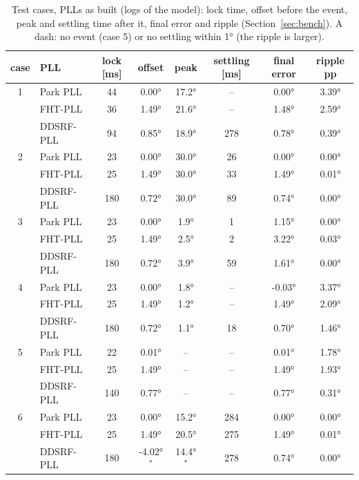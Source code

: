 \documentclass[11pt,a4paper]{scrartcl}
\begin{document}
\begin{onehalfspace}
\begin{table}[H]
	\centering
	\caption{Test cases, PLLs as built (logs of the model): lock time, offset before the event, peak and settling time after it, final error and ripple (Section~\ref{sec:bench}). A dash: no event (case 5) or no settling within \ang{1} (the ripple is larger).}
	\label{tab:results}
	\footnotesize
	\begin{tabular}{@{} c l c c c c c c @{}}
		\toprule
		case & PLL & lock [ms] & offset & peak & settling [ms] & final error & ripple pp \\
		\midrule
		1 & Park PLL & 44 & \ang{0.00} & \ang{17.2} & -- & \ang{0.00} & \ang{3.39} \\
		 & FHT-PLL & 36 & \ang{1.49} & \ang{21.6} & -- & \ang{1.48} & \ang{2.59} \\
		 & DDSRF-PLL & 94 & \ang{0.85} & \ang{18.9} & 278 & \ang{0.78} & \ang{0.39} \\
		2 & Park PLL & 23 & \ang{0.00} & \ang{30.0} & 26 & \ang{0.00} & \ang{0.00} \\
		 & FHT-PLL & 25 & \ang{1.49} & \ang{30.0} & 33 & \ang{1.49} & \ang{0.01} \\
		 & DDSRF-PLL & 180 & \ang{0.72} & \ang{30.0} & 89 & \ang{0.74} & \ang{0.00} \\
		3 & Park PLL & 23 & \ang{0.00} & \ang{1.9} & 1 & \ang{1.15} & \ang{0.00} \\
		 & FHT-PLL & 25 & \ang{1.49} & \ang{2.5} & 2 & \ang{3.22} & \ang{0.03} \\
		 & DDSRF-PLL & 180 & \ang{0.72} & \ang{3.9} & 59 & \ang{1.61} & \ang{0.00} \\
		4 & Park PLL & 23 & \ang{0.00} & \ang{1.8} & -- & \ang{-0.03} & \ang{3.37} \\
		 & FHT-PLL & 25 & \ang{1.49} & \ang{1.2} & -- & \ang{1.49} & \ang{2.09} \\
		 & DDSRF-PLL & 180 & \ang{0.72} & \ang{1.1} & 18 & \ang{0.70} & \ang{1.46} \\
		5 & Park PLL & 22 & \ang{0.01} & -- & -- & \ang{0.01} & \ang{1.78} \\
		 & FHT-PLL & 25 & \ang{1.49} & -- & -- & \ang{1.49} & \ang{1.93} \\
		 & DDSRF-PLL & 140 & \ang{0.77} & -- & -- & \ang{0.77} & \ang{0.31} \\
		6 & Park PLL & 23 & \ang{0.00} & \ang{15.2} & 284 & \ang{0.00} & \ang{0.00} \\
		 & FHT-PLL & 25 & \ang{1.49} & \ang{20.5} & 275 & \ang{1.49} & \ang{0.01} \\
		 & DDSRF-PLL & 180 & \ang{-4.02}$^{*}$ & \ang{14.4}$^{*}$ & 278 & \ang{0.74} & \ang{0.00} \\
		\bottomrule
	\end{tabular}
	\par{}
\end{table}


\end{onehalfspace}
\end{document}
